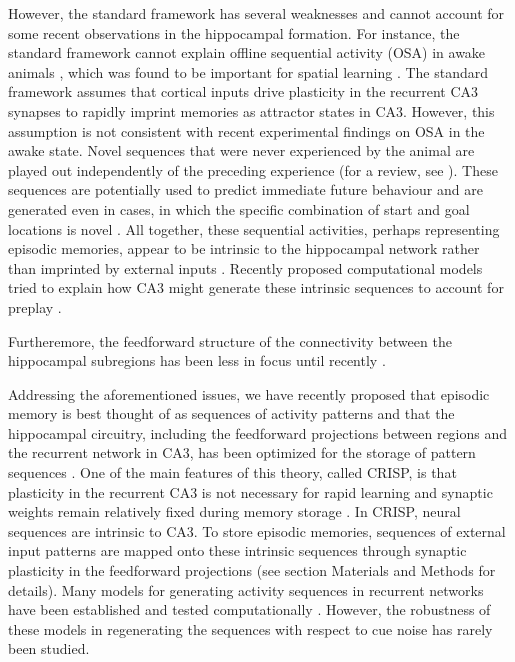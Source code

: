 \documentclass[utf8]{frontiersSCNS} %
\begin{document}
However, the standard framework has several weaknesses and cannot account for some recent observations in the hippocampal formation. For instance, the standard framework cannot explain offline sequential activity (OSA) in awake animals \cite{cheng2013crisp}, which was found to be important for spatial learning \cite{jadhav2012awake}. The standard framework assumes that cortical inputs drive plasticity in the recurrent CA3 synapses to rapidly imprint memories as attractor states in CA3. However, this assumption is not consistent with recent experimental findings on OSA in the awake state. Novel sequences that were never experienced by the animal are played out independently of the preceding experience \cite{gupta2010hippocampal} (for a review, see \cite{dragoi2011preplay}). These sequences are potentially used to predict immediate future behaviour and are generated even in cases, in which the specific combination of start and goal locations is novel \cite{pfeiffer2013hippocampal}. All together, these sequential activities, perhaps representing episodic memories, appear to be intrinsic to the hippocampal network rather than imprinted by external inputs \cite{cheng2013crisp}. Recently proposed computational models tried to explain how CA3 might generate these intrinsic sequences to account for preplay \cite{azizi2013computational, romani2015short}. 

Furtheremore, the feedforward structure of the connectivity between the hippocampal subregions \cite{amaral1990chapter} has been less in focus until recently \cite{neher2015memory, pyka2014pattern}.  

Addressing the aforementioned issues, we have recently proposed that episodic memory is best thought of as sequences of activity patterns \cite{cheng2016episodic} and that the hippocampal circuitry, including the feedforward projections  between regions and the recurrent network in CA3, has been optimized for the storage of pattern sequences \cite{cheng2013crisp}. One of the main features of this theory, called CRISP, is that plasticity in the recurrent CA3 is not necessary for rapid learning and synaptic weights remain relatively fixed during memory storage \cite{nakazawa2003hippocampal, cravens2006ca3}. In CRISP, neural sequences are intrinsic to CA3. To store episodic memories, sequences of external input patterns are mapped onto these intrinsic sequences through synaptic plasticity in the feedforward projections \cite{willshaw1969non} (see section Materials and Methods for details).
Many models for generating activity sequences in recurrent networks have been established and tested computationally \cite{sussillo2009generating, lazar2009sorn, rajan2016recurrent, jaeger2001echo, kropff2007complexity, bayati2015self}. However, the robustness of these models in regenerating the sequences with respect to cue noise has rarely been studied.
\end{document}
